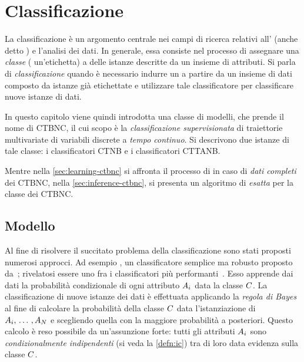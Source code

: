 
\chapter{Classificazione}
\label{cap:ctbnc}
La classificazione è un argomento centrale nei campi di ricerca relativi all' (anche detto ) e l'analisi dei dati. In generale, essa consiste nel processo di assegnare una \emph{classe} (\ie{} un'etichetta) a delle istanze descritte da un insieme di attributi. Si parla di \emph{classificazione } quando è necessario indurre un  a partire da un insieme di dati composto da istanze già etichettate e utilizzare tale classificatore per classificare nuove istanze di dati.

In questo capitolo viene quindi introdotta una classe di modelli, che prende il nome di \acf{CTBNC}, il cui scopo è la \emph{classificazione supervisionata} di traiettorie multivariate di variabili discrete a \emph{tempo continuo}. Si descrivono due istanze di tale classe: i classificatori \acf{CTNB} e i classificatori \acf{CTTANB}.

Mentre nella \autoref{sec:learning-ctbnc} si affronta il processo di \emph{} in caso di \emph{dati completi} dei \acs{CTBNC}, nella \autoref{sec:inference-ctbnc}, si presenta un algoritmo di \emph{ esatta} per la classe dei \acs{CTBNC}.

\section{Modello}\label{sec:ctbnc-model}
Al fine di risolvere il succitato problema della classificazione sono stati proposti numerosi approcci. Ad esempio \lwcase \nb{} \class{}, un classificatore semplice ma robusto proposto da~\citet{DudaHart1973}; rivelatosi essere uno fra i classificatori più performanti~\citep{Langley1992}. Esso apprende dai dati la probabilità condizionale di ogni attributo $\mathnormal{A}_i$ data la classe $\mathnormal{C}$. La classificazione di nuove istanze dei dati è effettuata applicando la \emph{regola di Bayes} al fine di calcolare la probabilità della classe $\mathnormal{C}$ data l'istanziazione di $\mathnormal{A}_i,\,\dotsc\,,\mathnormal{A}_N$ e scegliendo quella con la maggiore probabilità a posteriori. Questo calcolo è reso possibile da un'assunzione forte: tutti gli attributi $\mathnormal{A}_i$ sono \emph{condizionalmente indipendenti} (si veda la \autoref{defn:ic}) tra di loro data evidenza sulla classe $\mathnormal{C}$.


